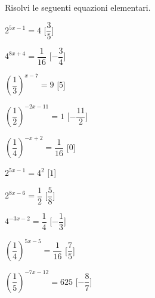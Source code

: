 \begin{esercizio}\label{ese:}
 Risolvi le seguenti equazioni elementari.
\begin{multicols}{2}
 \begin{enumeratea}
  \item  \(2^{5 x -1} = 4\)
   \hfill [\(\dfrac{3}{5}\)]
  \item  \(4^{8 x +4} = \dfrac{1}{16}\)
   \hfill [\(-\dfrac{3}{4}\)]
  \item  \(\left(\dfrac{1}{3}\right)^{x -7} = 9\)
   \hfill [\(5\)]
  \item  \(\left(\dfrac{1}{2}\right)^{-2 x -11} = 1\)
   \hfill [\(-\dfrac{11}{2}\)]
  \item  \(\left(\dfrac{1}{4}\right)^{- x +2} = \dfrac{1}{16}\)
   \hfill [\(0\)]
  \item  \(2^{5 x -1} = 4^2\)
   \hfill [\(1\)]
  \item  \(2^{8 x -6} = \dfrac{1}{2}\)
   \hfill [\(\dfrac{5}{8}\)]
  \item  \(4^{-3 x -2} = \dfrac{1}{4}\)
   \hfill [\(-\dfrac{1}{3}\)]
  \item  \(\left(\dfrac{1}{4}\right)^{5 x -5} = \dfrac{1}{16}\)
   \hfill [\(\dfrac{7}{5}\)]
  \item  \(\left(\dfrac{1}{5}\right)^{-7 x -12} = 625\)
   \hfill [\(-\dfrac{8}{7}\)]
 \end{enumeratea}
 \end{multicols}
\end{esercizio}


